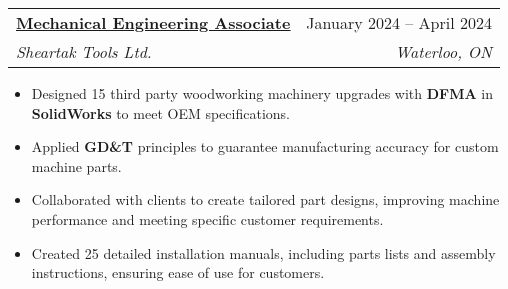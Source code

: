 \documentclass[letterpaper]{article}
\makeatletter
\newcommand{\resumeItem}[1]{
  \item\small{
    {#1 \vspace{-2pt}}
  }
}
\newcommand{\resumeSubheading}[4]{
  \vspace{-2pt}\item
    \begin{tabular*}{0.97\textwidth}[t]{l@{\extracolsep{\fill}}r}
      \textbf{#1} & #2 \\
      \textit{\small#3} & \textit{\small #4} \\
    \end{tabular*}\vspace{-7pt}
}
\newcommand{\resumeItemListStart}{\begin{itemize}}
\newcommand{\resumeItemListEnd}{\end{itemize}\vspace{-5pt}}
\makeatother
\begin{document}


\resumeSubheading
{\href{https://www.gavintranquilino.com/sheartak.html}{\underline{Mechanical Engineering Associate}}}{January 2024 -- April 2024}
{Sheartak Tools Ltd.}{Waterloo, ON}
\resumeItemListStart
\resumeItem{Designed 15 third party woodworking machinery upgrades with \textbf{DFMA} in \textbf{SolidWorks} to meet OEM specifications.}
\resumeItem{Applied \textbf{GD\&T} principles to guarantee manufacturing accuracy for custom machine parts.}
\resumeItem{Collaborated with clients to create tailored part designs, improving machine performance and meeting specific customer requirements.}
\resumeItem{Created 25 detailed installation manuals, including parts lists and assembly instructions, ensuring ease of use for customers.}
\resumeItemListEnd


\end{document}
